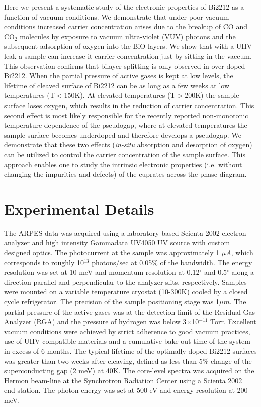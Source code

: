 \documentclass[aps,twocolumn,amsmath,amssymb,showpacs,prb,
superscriptaddress,unsortedaddress]{revtex4}
\begin{document}
Here we present a systematic study of the electronic properties of
Bi2212 as a function of vacuum conditions.  We demonstrate that under
poor vacuum conditions increased carrier concentration arises due to
the breakup of CO and CO$_2$ molecules by exposure to vacuum
ultra-violet (VUV) photons and the subsequent adsorption of oxygen
into the BiO layers. We show that with a UHV leak a sample can
increase it carrier concentration just by sitting in the vaccum.  This
observation confirms that bilayer splitting is only observed in
over-doped Bi2212.  When the partial pressure of active gases is kept
at low levels, the lifetime of cleaved surface of Bi2212 can be as
long as a few weeks at low temperatures (T$<$150K). At elevated
temperatures (T$>$200K) the sample surface loses oxygen, which results
in the reduction of carrier concentration. This second effect is most
likely responsible for the recently reported non-monotonic temperature
dependence of the pseudogap\cite{A. A. Kordyuk 2008}, where at
elevated temperatures the sample surface becomes underdoped and
therefore develops a pseudogap. We demonstrate that these two effects
(\textit{in-situ} absorption and desorption of oxygen) can be utilized
to control the carrier concentration of the sample surface. This
approach enables one to study the intrinsic electronic properties
(i.e. without changing the impurities and defects) of the cuprates
across the phase diagram.

\section{Experimental Details}

The ARPES data was acquired using a laboratory-based Scienta 2002
electron analyzer and high intensity Gammadata UV4050 UV source  with
custom designed optics. The photocurrent at the sample was
approximately 1 $\mu A$, which corresponds to roughly 10$^{13}$
photons/sec at 0.05\% of the bandwidth. The energy resolution was set
at 10 meV and momentum resolution at 0.12$^{\circ}$ and 0.5$^{\circ}$
along a direction parallel and perpendicular to the analyzer slits,
respectively. Samples were mounted on a variable temperature cryostat
(10-300K) cooled by a closed cycle refrigerator. The precision of the
sample positioning stage was 1$\mu m$. The partial pressure of the
active gases was at the detection limit of the Residual Gas Analyzer
(RGA) and the pressure of hydrogen was below 3$\times$10$^{-11}$ Torr.
Excellent vacuum conditions were achieved by strict adherence to good
vacuum practices, use of UHV compatible materials and a cumulative
bake-out time of the system in excess of 6 months. The typical
lifetime of the optimally doped Bi2212 surfaces was greater than two
weeks after cleaving, defined as less than 5\% change of the
superconducting gap (2 meV) at 40K.  The core-level spectra was
acquired on the Hermon beam-line at the Synchrotron Radiation Center
using a Scienta 2002 end-station. The photon energy was set at 500 eV
and energy resolution at 200 meV.
\end{document}
